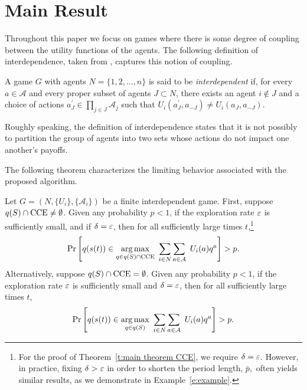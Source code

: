 \section{Main Result}

Throughout this paper we focus on games where there is some degree of coupling between the utility functions of the agents.  The following definition of interdependence, taken from \cite{Young2009}, captures this notion of coupling.  
 
\begin{defn}
A game $G$ with agents $N = \{1,2,\ldots,n\}$ is said to be \emph{interdependent} if, for every $a\in\mathcal{A}$ and every proper subset of agents $J\subset N$, there exists an agent $i\notin J$ and a choice of actions $a_J^\prime\in\prod_{j\in J} \mathcal{A}_j$ such that $U_i(a_J^\prime,a_{-J})\neq U_i(a_J,a_{-J}).$
\end{defn}

Roughly speaking, the definition of interdependence states that it is not possibly to partition the group of agents into two sets whose actions do not impact one another's payoffs.

The following theorem characterizes the limiting behavior associated with the proposed algorithm. 

\begin{Theorem}\label{t:main theorem CCE}
%
Let $G = \left (N,\{U_i\},\{\mathcal{A}_i\}\right)$ be a finite interdependent game. 
%
First, suppose $q(S) \cap {\rm CCE} \neq \emptyset$.  Given any probability $p < 1$, if the exploration rate $\varepsilon$ is sufficiently small, and if $\delta = \varepsilon$, then for all sufficiently large times $t$,\footnote{For the proof of Theorem~\ref{t:main theorem CCE}, we require $\delta = \varepsilon$. However, in practice, fixing $\delta>\varepsilon$ in order to shorten the period length, $\bar{p},$ often yields similar results, as we demonstrate in Example~\ref{e:example}.}
%
$$ {\rm Pr} \left[q(s(t)) \in \underset{ q \in q(S) \cap {\rm CCE}}{\arg \max} \ \sum_{i \in N} \sum_{a \in \aee} \ U_i(a) q^a \right] > p. $$ 
%
Alternatively, suppose $q(S) \cap {\rm CCE} = \emptyset$.  Given any probability $p < 1$, if the exploration rate $\varepsilon$ is sufficiently small and $\delta = \varepsilon$, then for all sufficiently large times $t$, 
%
$$ {\rm Pr} \left[q(s(t)) \in \underset{ q \in q(S)}{\arg \max} \ \sum_{i \in N} \sum_{a \in {\cal A}} \ U_i(a) q^a \right] > p. $$ 
%
\end{Theorem}

\vspace{.1cm}

